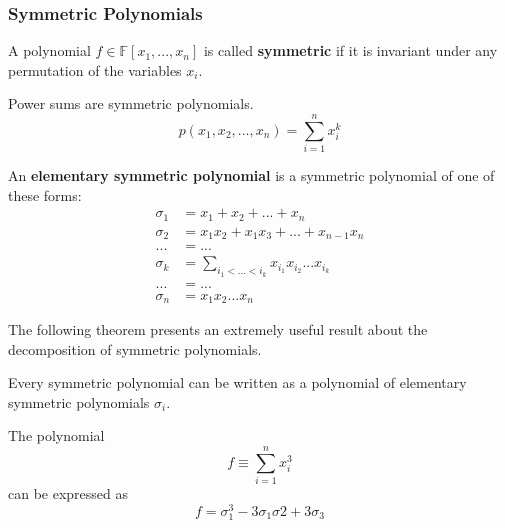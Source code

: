     \subsubsection{Symmetric Polynomials}

      \begin{definition}
        A polynomial $f \in \mathbb{F}[x_1, ..., x_n]$ is called \textbf{symmetric} if it is invariant under any permutation of the variables $x_i$. 
      \end{definition}

      \begin{example}
        Power sums are symmetric polynomials. 
        \begin{equation}
          p(x_1, x_2, ..., x_n) = \sum_{i=1}^n x_i^k
        \end{equation}
      \end{example}

      \begin{definition}
        An \textbf{elementary symmetric polynomial} is a symmetric polynomial of one of these forms: 
        \begin{align*}
          \sigma_1 & = x_1 + x_2 + ... + x_n \\
          \sigma_2 & = x_1 x_2 + x_1 x_3 + ... + x_{n-1} x_n \\
          ... & = ... \\
          \sigma_k & = \sum_{i_1 < ... < i_k} x_{i_1} x_{i_2} ... x_{i_k} \\
          ... & = ... \\
          \sigma_n & = x_1 x_2 ... x_n
        \end{align*}
      \end{definition}

      The following theorem presents an extremely useful result about the decomposition of symmetric polynomials. 

      \begin{theorem}
        Every symmetric polynomial can be written as a polynomial of elementary symmetric polynomials $\sigma_i$. 
      \end{theorem}

      \begin{example}
        The polynomial 
        \begin{equation}
          f \equiv \sum_{i=1}^n x_i^3
        \end{equation}
        can be expressed as 
        \begin{equation}
          f = \sigma_1^3 - 3 \sigma_1 \sigma 2 + 3 \sigma_3
        \end{equation}
      \end{example}

